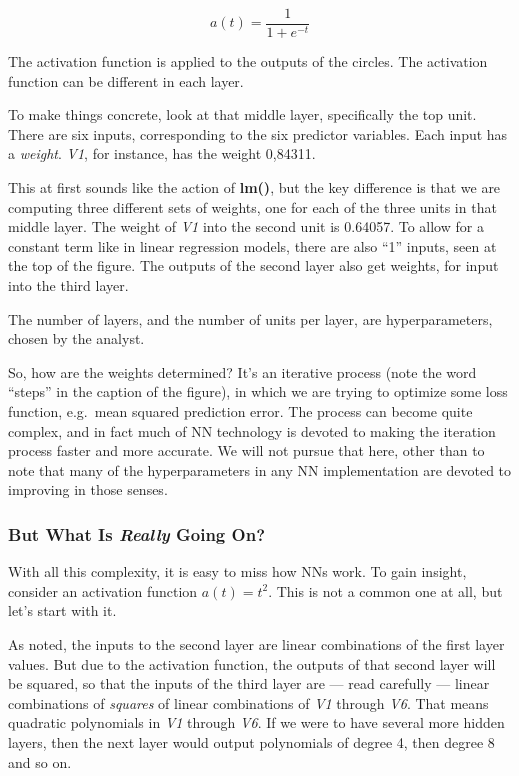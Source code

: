 \begin{equation}
\label{logit}
a(t) = \frac{1}{1 + e^{-t}}
\end{equation}

The activation function is applied to the outputs of the circles. The
activation function can be different in each layer.

To make things concrete, look at that middle layer, specifically the top
unit.  There are six inputs, corresponding to the six predictor
variables.  Each input has a \textit{weight}.  \textit{V1}, for
instance, has the weight 0,84311.

This at first sounds like the action of \textbf{lm()}, but the key
difference is that we are computing three different sets of weights, one
for each of the three units in that middle layer.  The weight of
\textit{V1} into the second unit is 0.64057.  To allow for a constant
term like in linear regression models, there are also ``1'' inputs, seen
at the top of the figure.  The outputs of the second layer also get
weights, for input into the third layer.

The number of layers, and the number of units per layer, are
hyperparameters, chosen by the analyst.

So, how are the weights determined?  It's an iterative process (note the
word ``steps'' in the caption of the figure), in which we are trying to
optimize some loss function, e.g.\ mean squared prediction error.  The
process can become quite complex, and in fact much of NN technology is
devoted to making the iteration process faster and more accurate.  We
will not pursue that here, other than to note that many of the
hyperparameters in any NN implementation are devoted to improving in
those senses.

\subsubsection{But What Is \emph{Really} Going On?}

With all this complexity, it is easy to miss how NNs work.  To gain
insight, consider an activation function $a(t) = t^2$.  This is not a
common one at all, but let's start with it.

As noted, the inputs to the second layer are linear combinations of the
first layer values.  But due to the activation function, the outputs of
that second layer will be squared, so that the inputs of the third layer
are --- read carefully --- linear combinations of \textit{squares} of
linear combinations of \textit{V1} through \textit{V6}.  That means
quadratic polynomials in \textit{V1} through \textit{V6}.  If we were to
have several more hidden layers, then the next layer would output
polynomials of degree 4, then degree 8 and so on.

